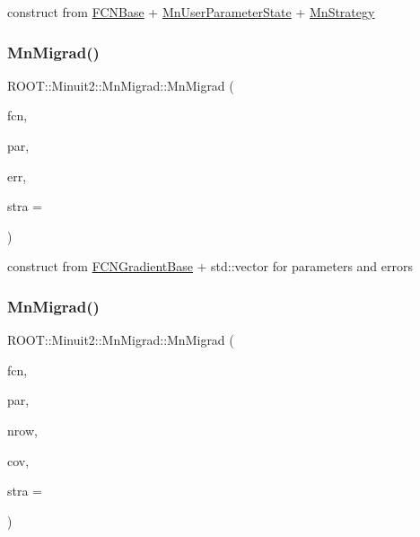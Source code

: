construct from \mbox{\hyperlink{classROOT_1_1Minuit2_1_1FCNBase}{F\+C\+N\+Base}} + \mbox{\hyperlink{classROOT_1_1Minuit2_1_1MnUserParameterState}{Mn\+User\+Parameter\+State}} + \mbox{\hyperlink{classROOT_1_1Minuit2_1_1MnStrategy}{Mn\+Strategy}} 

\mbox{\label{classROOT_1_1Minuit2_1_1MnMigrad_a2c295cfd762493e53e71d2cd004c3061}} 
\subsubsection{\texorpdfstring{MnMigrad()}{MnMigrad()}\hspace{0.1cm}{\footnotesize\ttfamily [7/39]}}
{\footnotesize\ttfamily R\+O\+O\+T\+::\+Minuit2\+::\+Mn\+Migrad\+::\+Mn\+Migrad (\begin{DoxyParamCaption}\item[{const \mbox{\hyperlink{classROOT_1_1Minuit2_1_1FCNGradientBase}{F\+C\+N\+Gradient\+Base}} \&}]{fcn,  }\item[{const std\+::vector$<$ double $>$ \&}]{par,  }\item[{const std\+::vector$<$ double $>$ \&}]{err,  }\item[{unsigned int}]{stra = {} }\end{DoxyParamCaption})\hspace{0.3cm}{\ttfamily [inline]}}



construct from \mbox{\hyperlink{classROOT_1_1Minuit2_1_1FCNGradientBase}{F\+C\+N\+Gradient\+Base}} + std\+::vector for parameters and errors 

\mbox{\label{classROOT_1_1Minuit2_1_1MnMigrad_a08924727b4a6e4fb5bd15816a88e5878}} 
\subsubsection{\texorpdfstring{MnMigrad()}{MnMigrad()}\hspace{0.1cm}{\footnotesize\ttfamily [8/39]}}
{\footnotesize\ttfamily R\+O\+O\+T\+::\+Minuit2\+::\+Mn\+Migrad\+::\+Mn\+Migrad (\begin{DoxyParamCaption}\item[{const \mbox{\hyperlink{classROOT_1_1Minuit2_1_1FCNGradientBase}{F\+C\+N\+Gradient\+Base}} \&}]{fcn,  }\item[{const std\+::vector$<$ double $>$ \&}]{par,  }\item[{unsigned int}]{nrow,  }\item[{const std\+::vector$<$ double $>$ \&}]{cov,  }\item[{unsigned int}]{stra = {} }\end{DoxyParamCaption})\hspace{0.3cm}{\ttfamily [inline]}}



